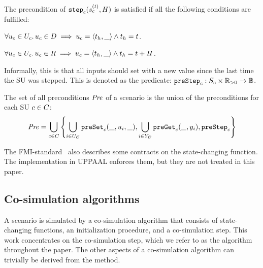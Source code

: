   \begin{definition}\label{def:step}
  The precondition of $\mathtt{step}_{c}(s_{c}^{(t)}, H)$ is satisfied if all the following conditions are fulfilled:
  \begin{compactitem}
    \item $\forall u_{c} \in U_{c} \ldotp u_{c} \in D \implies u_{c} =  \left\langle t_h,\_ \right\rangle  \land t_h = t$. 
    \item  $\forall u_{c} \in U_{c} \ldotp u_{c} \in R \implies u_{c} =  \left\langle t_h,\_ \right\rangle  \land t_h = t + H$.
  \end{compactitem}
  Informally, this is that all inputs should set with a new value since the last time the SU was stepped.
  This is denoted as the predicate: $\mathtt{preStep}_{c}: S_{c} \times \mathbb{R}_{> 0} \to \mathbb{B}$.
  \end{definition}
\begin{definition}\label{def:precondition}
  The set of all preconditions $\mathit{Pre}$ of a scenario is the union of the preconditions for each SU $c \in C$:
  \begin{align}
    \mathit{Pre} = \bigcup_{c \in C}  \left\{ \bigcup_{i \in U_{C}}\mathtt{preSet}_{c}(\_, u_{i}, \_), \bigcup_{i \in Y_{C}}\mathtt{preGet}_{c}(\_, y_{i}), \mathtt{preStep}_{c} \right\}
  \end{align}
\end{definition}

The FMI-standard~\cite{FMI2014} also describes some contracts on the state-changing function. The implementation in UPPAAL enforces them, but they are not treated in this paper.  


\subsection{Co-simulation algorithms}\label{sc:cosimalgo}
A scenario is simulated by a co-simulation algorithm that consists of state-changing functions, an initialization procedure, and a co-simulation step. This work concentrates on the co-simulation step, which we refer to as the algorithm throughout the paper. The other aspects of a co-simulation algorithm can trivially be derived from the method.  

